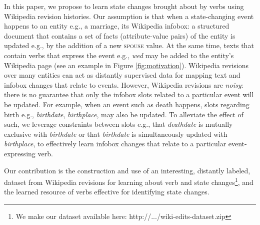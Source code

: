 In this paper, we propose to learn state changes brought about by verbs using Wikipedia revision histories. Our assumption is that when a state-changing event happens to an entity e.g., a marriage, its Wikipedia infobox: a structured document that contains a set of facts (attribute-value pairs) of the entity is updated e.g., by the addition of a new \textsc{spouse} value. At the same time, texts that contain verbs that express the event e.g., \textit{wed} may be added to the entity's Wikipedia page (see an example in Figure \ref{fig:motivation}). Wikipedia revisions over many entities can act as distantly supervised data for mapping text and infobox changes that relate to events. However, Wikipedia revisions are \textit{noisy}: there is no guarantee that only the infobox slots related to a particular event will be updated. For example, when an event such as death happens, slots regarding birth e.g., \textit{birthdate}, \textit{birthplace}, may also be updated. To alleviate the effect of such, we leverage constraints between slots e.g., that \textit{deathdate} is mutually exclusive with \textit{birthdate} or that \textit{birthdate} is simultaneously updated with \textit{birthplace}, to effectively learn infobox changes that relate to a particular event-expressing verb. 

Our contribution is the construction and use of an interesting, distantly labeled, dataset from Wikipedia revisions for learning about verb and state changes\footnote[1]{We make our dataset available here: http://.../wiki-edits-dataset.zip}, and the learned resource of verbs effective for identifying state changes.